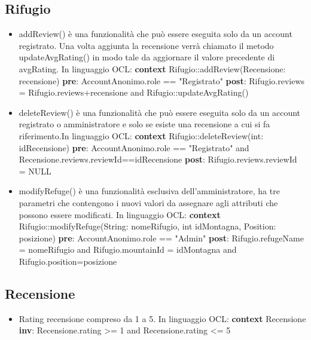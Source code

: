 \documentclass[a4paper,12pt]{article}
\begin{document}
\subsection{Rifugio}
\begin{itemize}
    \item addReview() è una funzionalità che può essere eseguita solo da un account registrato. Una volta aggiunta la recensione verrà chiamato il metodo updateAvgRating() in modo tale da aggiornare il valore precedente di avgRating. \newline \newline In linguaggio OCL:\newline
    \textbf{context} Rifugio::addReview(Recensione: recensione) \newline 
    \textbf{pre}: AccountAnonimo.role == "Registrato"\newline
    \textbf{post}: Rifugio.reviews = Rifugio.reviews+recensione and Rifugio::updateAvgRating() 
    \item deleteReview() è una funzionalità che può essere eseguita solo da un account registrato o amministratore e solo se esiste una recensione a cui si fa riferimento.\newline \newline In linguaggio OCL:\newline
    \textbf{context} Rifugio::deleteReview(int: idRecensione) \newline
    \textbf{pre}: AccountAnonimo.role == "Registrato" \newline 
    and Recensione.reviews.reviewId==idRecensione \newline
    \textbf{post}: Rifugio.reviews.reviewId = NULL  
    \item modifyRefuge() è una funzionalità esclusiva dell'amministratore, ha tre parametri che contengono i nuovi valori da assegnare agli attributi che possono essere modificati. \newline \newline In linguaggio OCL:\newline
    \textbf{context} Rifugio::modifyRefuge(String: nomeRifugio, int idMontagna, Position: posizione) \newline
    \textbf{pre}: AccountAnonimo.role == "Admin" \newline
    \textbf{post}: Rifugio.refugeName = nomeRifugio and Rifugio.mountainId = idMontagna and Rifugio.position=posizione 
\end{itemize}


\subsection{Recensione}
\begin{itemize}
    \item Rating recensione compreso da 1 a 5. \newline \newline In linguaggio OCL:\newline
    \textbf{context} Recensione \textbf{inv}: Recensione.rating >= 1 and Recensione.rating <= 5
     
\end{itemize}
\end{document}
